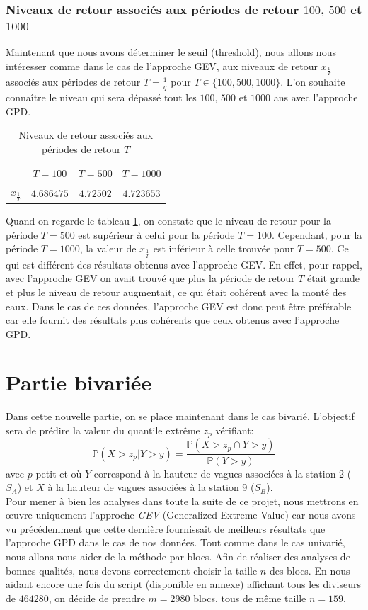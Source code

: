 \documentclass[a4paper,french,10pt]{article}
\begin{document}
\subsubsection{Niveaux de retour associés aux périodes de retour $100$, $500$ et $1000$}
Maintenant que nous avons déterminer le seuil (threshold), nous allons nous intéresser comme dans le cas de l'approche GEV, aux niveaux de retour $x_{\frac{1}{T}}$ associés aux périodes de retour $T = \frac{1}{q}$ pour $T \in \{100,500,1000\}$. L'on souhaite connaître le niveau qui sera dépassé tout les $100$, $500$ et $1000$ ans avec l'approche GPD.

\begin{table}[htp]
	\center
	\begin{tabular}{|c||c|c|c|}
		\hline
		\diagbox{Niveau de retour}{Périodes ou Années $T$} & $T = 100$ & $T = 500$ & $T = 1000$\\
		\hline
		$x_{\frac{1}{T}}$ & $4.686475$ & $4.72502$ & $4.723653$ \\
		\hline
	\end{tabular}
	\caption{Niveaux de retour associés aux périodes de retour $T$}
	\label{tab3}
\end{table}
Quand on regarde le tableau \ref{tab3}, on constate que le niveau de retour pour la période $T=500$ est supérieur à celui pour la période $T=100$. Cependant, pour la période $T=1000$, la valeur de $x_{\frac{1}{T}}$ est inférieur à celle trouvée pour $T = 500$. Ce qui est différent des résultats obtenus avec l'approche GEV. En effet, pour rappel, avec l'approche GEV on avait trouvé que plus la période de retour $T$ était grande et plus le niveau de retour augmentait, ce qui était cohérent avec la monté des eaux. Dans le cas de ces données, l'approche GEV est donc peut être préférable car elle fournit des résultats plus cohérents que ceux obtenus avec l'approche GPD.

\section{Partie bivariée}
Dans cette nouvelle partie, on se place maintenant dans le cas bivarié.
L'objectif sera de prédire la valeur du quantile extrême $z_p$ vérifiant:
\begin{equation}
	\label{quantile_extreme}
	\mathbb{P}(X > z_p | Y > y) = \frac{\mathbb{P}(X > z_p \cap Y > y)}{\mathbb{P}(Y > y)}
\end{equation}
avec $p$ petit et où $Y$ correspond à la hauteur de vagues associées à la station 2 ($S_A$) et $X$ à la hauteur de vagues associées à la station 9 ($S_B$). \\
Pour mener à bien les analyses dans toute la suite de ce projet, nous mettrons en œuvre uniquement l'approche \textit{GEV} (Generalized Extreme Value) car nous avons vu précédemment que cette dernière fournissait de meilleurs résultats que l'approche GPD dans le cas de nos données. Tout comme dans le cas univarié, nous allons nous aider de la méthode par blocs. Afin de réaliser des analyses de bonnes qualités, nous devons correctement choisir la taille $n$ des blocs. En nous aidant encore une fois du script (disponible en annexe) affichant tous les diviseurs de $464280$, on décide de prendre $m = 2980$ blocs, tous de même taille $n = 159$.
\end{document}
